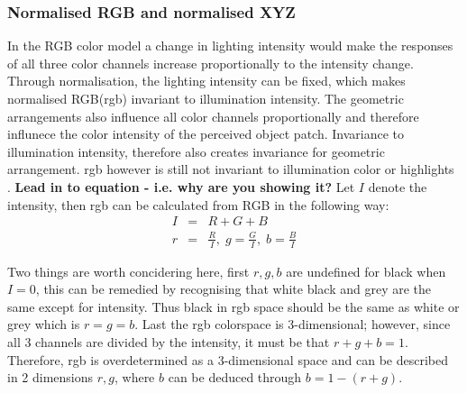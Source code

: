 \documentclass[a4paper,11pt]{article}
\begin{document}
		
\subsubsection{Normalised RGB and normalised XYZ}

In the RGB color model a change in lighting intensity would make the responses of all three color channels increase proportionally to the intensity change. Through normalisation, the lighting intensity can be fixed, which makes normalised RGB(rgb) invariant to illumination intensity. The geometric arrangements also influence all color channels proportionally and therefore influnece the color intensity of the perceived object patch. Invariance to illumination intensity, therefore also creates invariance for geometric arrangement. rgb however is still not invariant to illumination color or highlights \cite{gevers_invariant}. \textbf{Lead in to equation - i.e. why are you showing it?}
Let $I$ denote the intensity, then rgb can be calculated from RGB in the following way:
\begin{eqnarray}
\label{eq:rgb}
I &=& R+G+B \\
r &=& \frac{R}{I},\; g = \frac{G}{I},\; b = \frac{B}{I}
\end{eqnarray}

Two things are worth concidering here, first $r,g,b$ are undefined for black when $I=0$, this can be remedied by recognising that white black and grey are the same except for intensity. Thus black in rgb space should be the same as white or grey which is $r=g=b$. Last the rgb colorspace is 3-dimensional; however, since all 3 channels are divided by the intensity, it must be that $r+g+b=1$. Therefore, rgb is overdetermined as a 3-dimensional space and can be described in 2 dimensions $r,g$, where $b$ can be deduced through $b=1-(r+g)$.
\end{document}
